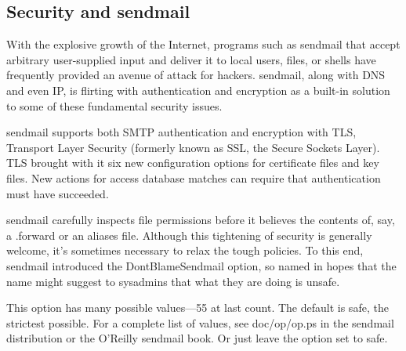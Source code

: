 \protect\hypertarget{part0026_split_038.html}{}{}

\hypertarget{part0026_split_038.htmlux5cux23_idContainer1247}{}
\hypertarget{part0026_split_038.htmlux5cux23calibre_pb_37}{%
\subsection[Security and
{sendmail}]{\texorpdfstring{\protect\hypertarget{part0026_split_038.htmlux5cux23_idTextAnchor1100}{}{}\protect\hypertarget{part0026_split_038.htmlux5cux23_idTextAnchor1101}{}{}Security
and
{sendmail}}{Security and sendmail}}\label{part0026_split_038.htmlux5cux23calibre_pb_37}}

{\protect\hypertarget{part0026_split_038.htmlux5cux23_idIndexMarker2577}{}{}\protect\hypertarget{part0026_split_038.htmlux5cux23_idIndexMarker2578}{}{}}With
the explosive growth of the Internet, programs such as {sendmail} that
accept arbitrary user-supplied input and deliver it to local users,
files, or shells have frequently provided an avenue of attack for
hackers. {sendmail}, along with DNS and even IP, is flirting with
authentication and encryption as a built-in solution to some of these
fundamental security issues.

{sendmail} supports both SMTP authentication and encryption with
\protect\hypertarget{part0026_split_038.htmlux5cux23_idIndexMarker2579}{}{}\protect\hypertarget{part0026_split_038.htmlux5cux23_idIndexMarker2580}{}{}TLS,
Transport Layer Security (formerly known as SSL, the Secure Sockets
Layer). TLS brought with it six new configuration options for
certificate files and key files. New actions for access database matches
can require that authentication must have succeeded.

{sendmail} carefully inspects file permissions before it believes the
contents of, say, a {.forward} or an {aliases} file. Although this
tightening of security is generally welcome, it's sometimes necessary to
relax the tough policies. To this end, {sendmail} introduced the
\protect\hypertarget{part0026_split_038.htmlux5cux23_idIndexMarker2581}{}{}{DontBlameSendmail}
option, so named in hopes that the name might suggest to sysadmins that
what they are doing is unsafe.

This option has many possible values---55 at last count. The default is
{safe}, the strictest possible. For a complete list of values, see
{doc/op/op.ps }in the {sendmail} distribution or the O'Reilly {sendmail}
book. Or just leave the option set to {safe}.

